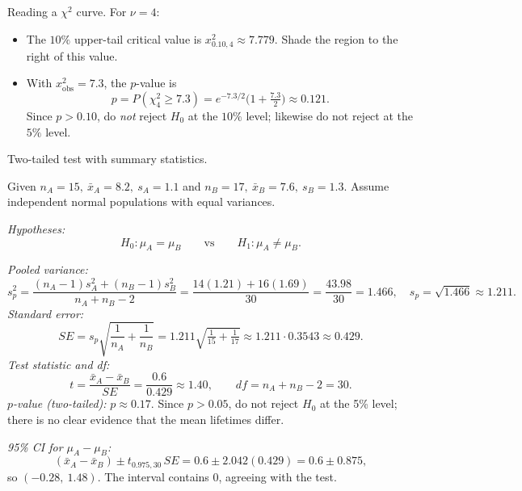 \documentclass[11pt]{article}
\def\textbf#1{#1}%
\def\mathrm#1{#1}%
\begin{document}
\begin{solution}
\textbf{Reading a $\chi^2$ curve.} For $\nu=4$:
\begin{itemize}
  \item The $10\%$ upper-tail critical value is $x^2_{0.10,4}\approx \boxed{7.779}$. Shade the region to the right of this value.
  \item With $x^2_{\text{obs}}=7.3$, the $p$-value is
  \[
  p=P(\chi^2_4\ge 7.3)=e^{-7.3/2}\bigl(1+\tfrac{7.3}{2}\bigr)\approx \boxed{0.121}.
  \]
  Since $p>0.10$, do \emph{not} reject $H_0$ at the $10\%$ level; likewise do not reject at the $5\%$ level.
\end{itemize}

\begin{center}
\end{center}
\end{solution}


\begin{solution}
\textbf{Two-tailed test with summary statistics.}

Given $n_A=15,\ \bar x_A=8.2,\ s_A=1.1$ and $n_B=17,\ \bar x_B=7.6,\ s_B=1.3$.
Assume independent normal populations with equal variances.

\emph{Hypotheses:}
\[
H_0:\mu_A=\mu_B \qquad\text{vs}\qquad H_1:\mu_A\ne\mu_B .
\]

\emph{Pooled variance:}
\[
s_p^2=\frac{(n_A-1)s_A^2+(n_B-1)s_B^2}{n_A+n_B-2}
=\frac{14(1.21)+16(1.69)}{30}=\frac{43.98}{30}=1.466,\quad s_p=\sqrt{1.466}\approx1.211.
\]
\emph{Standard error:}
\[
\mathrm{SE}=s_p\sqrt{\frac1{n_A}+\frac1{n_B}}=1.211\sqrt{\tfrac1{15}+\tfrac1{17}}
\approx 1.211\cdot 0.3543\approx 0.429.
\]
\emph{Test statistic and df:}
\[
t=\frac{\bar x_A-\bar x_B}{\mathrm{SE}}=\frac{0.6}{0.429}\approx 1.40,\qquad \mathrm{df}=n_A+n_B-2=30.
\]
\emph{$p$-value (two-tailed):} $p\approx 0.17$.
Since $p>0.05$, \textbf{do not reject} $H_0$ at the 5\% level; there is no clear evidence that the mean lifetimes differ.

\emph{95\% CI for $\mu_A-\mu_B$:}
\[
( \bar x_A-\bar x_B ) \pm t_{0.975,30}\,\mathrm{SE}
=0.6\pm 2.042(0.429)=0.6\pm 0.875,
\]
so $\boxed{(-0.28,\ 1.48)}$. The interval contains $0$, agreeing with the test.
\end{solution}
\end{document}
